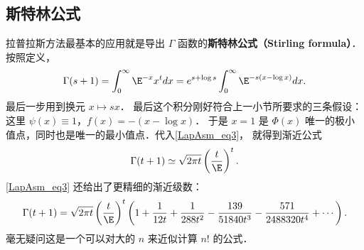\subsection{斯特林公式}
拉普拉斯方法最基本的应用就是导出 $\Gamma$ 函数的\textbf{斯特林公式（Stirling formula）}． 按照定义，
\[
  \Gamma(s+1)
  =\int_0^\infty \E^{-x}x^tdx
  =e^{s+\log s}\int_0^\infty \E^{-s(x-\log x)}dx.
\]
最后一步用到换元 $x\mapsto sx$． 最后这个积分刚好符合上一小节所要求的三条假设：这里 $\psi(x)\equiv1$，$f(x)=-(x-\log x)$． 于是 $x=1$ 是 $\Phi(x)$ 唯一的极小值点，同时也是唯一的最小值点．代入\autoref{LapAsm_eq3}， 就得到渐近公式
$$
\Gamma(t+1)\simeq\sqrt{2\pi t}\left(\frac{t}{\E}\right)^t.
$$
\autoref{LapAsm_eq3} 还给出了更精细的渐近级数：
$$
  \Gamma(t+1)
  =\sqrt{2\pi t}\left({t\over \E}\right)^t
  \left(
   1
   +{1\over12t}
   +{1\over288t^2}
   -{139\over51840t^3}
   -{571\over2488320t^4}
   + \cdots
  \right).
$$
毫无疑问这是一个可以对大的 $n$ 来近似计算 $n!$ 的公式．

